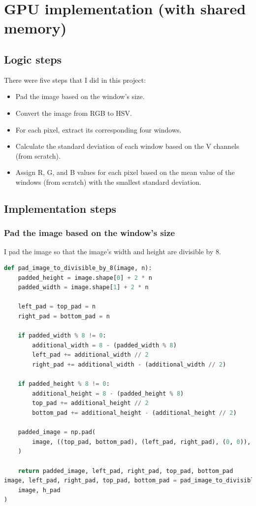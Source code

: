 \documentclass[12pt]{article}
\begin{document}
\section{GPU implementation (with shared memory)}

\subsection{Logic steps}
\noindent
There were five steps that I did in this project:

\begin{itemize}
    \item Pad the image based on the window's size.
    \item Convert the image from RGB to HSV.
    \item For each pixel, extract its corresponding four windows.
    \item Calculate the standard deviation of each window based on the V channels (from scratch).
    \item Assign R, G, and B values for each pixel based on the mean value of the windows (from scratch) with the smallest standard deviation.
\end{itemize}

\subsection{Implementation steps}

\subsubsection{Pad the image based on the window's size}
\noindent
I pad the image so that the image's width and height are divisible by 8.
\begin{lstlisting}[language=Python]
def pad_image_to_divisible_by_8(image, n):
    padded_height = image.shape[0] + 2 * n
    padded_width = image.shape[1] + 2 * n

    left_pad = top_pad = n
    right_pad = bottom_pad = n

    if padded_width % 8 != 0:
        additional_width = 8 - (padded_width % 8)
        left_pad += additional_width // 2
        right_pad += additional_width - (additional_width // 2)

    if padded_height % 8 != 0:
        additional_height = 8 - (padded_height % 8)
        top_pad += additional_height // 2
        bottom_pad += additional_height - (additional_height // 2)

    padded_image = np.pad(
        image, ((top_pad, bottom_pad), (left_pad, right_pad), (0, 0)), mode="constant"
    )

    return padded_image, left_pad, right_pad, top_pad, bottom_pad
image, left_pad, right_pad, top_pad, bottom_pad = pad_image_to_divisible_by_8(
    image, h_pad
)
\end{lstlisting}
\end{document}
